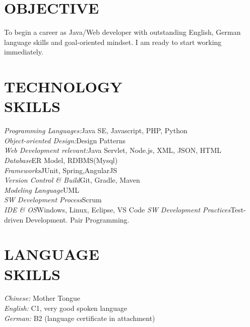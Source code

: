 \documentclass[margin, 10pt]{res} %
\begin{document}
\begin{resume}

 
\section{OBJECTIVE}  

To begin a career as Java/Web developer with outstanding English, German language skills and goal-oriented mindset. I am ready to start working immediately.

\section{TECHNOLOGY \\ SKILLS} 

{\sl Programming Languages:}\hfill		Java SE, Javascript, PHP, Python\\
{\sl Object-oriented Design:}\hfill 		Design Patterns\\
{\sl Web Development relevant:}\hfill 	Java Servlet, Node.js, XML, JSON, HTML\\
{\sl Database}\hfill 						ER Model, RDBMS(Mysql)\\ 
{\sl Frameworks}\hfill  					JUnit, Spring,AngularJS\\
{\sl Version Control \& Build}\hfill 	Git, Gradle, Maven\\
{\sl Modeling Language}\hfill 				UML\\
{\sl SW Development Process}\hfill 		Scrum\\
{\sl IDE \& OS}\hfill  					Windows, Linux, Eclipse, VS Code
{\sl SW Development Practices}\hfill	Test-driven Development. Pair Programming.



\section{LANGUAGE \\ SKILLS} 
{\sl Chinese:} 		Mother Tongue \\
{\sl English:} 		C1, very good spoken language\\
{\sl German:} 		B2 (language certificate in attachment)


\end{resume}
\end{document}
